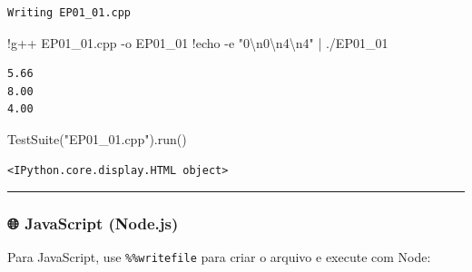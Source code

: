 \documentclass[
  portuguese,
  letterpaper,
  openany,
  oneside,
  12pt,
  a4paper]{book}
\newenvironment{Shaded}{\begin{snugshade}}{\end{snugshade}}
\newcommand{\CharTok}[1]{\textcolor[rgb]{0.13,0.47,0.30}{#1}}
\newcommand{\NormalTok}[1]{\textcolor[rgb]{0.00,0.23,0.31}{#1}}
\newcommand{\OperatorTok}[1]{\textcolor[rgb]{0.37,0.37,0.37}{#1}}
\newcommand{\StringTok}[1]{\textcolor[rgb]{0.13,0.47,0.30}{#1}}
\begin{document}
\begin{verbatim}
Writing EP01_01.cpp
\end{verbatim}

\begin{Shaded}
\begin{Highlighting}[]
\OperatorTok{!}\NormalTok{g}\OperatorTok{++}\NormalTok{ EP01\_01.cpp }\OperatorTok{{-}}\NormalTok{o EP01\_01}
\OperatorTok{!}\NormalTok{echo }\OperatorTok{{-}}\NormalTok{e }\StringTok{"0}\CharTok{\textbackslash{}n}\StringTok{0}\CharTok{\textbackslash{}n}\StringTok{4}\CharTok{\textbackslash{}n}\StringTok{4"} \OperatorTok{|}\NormalTok{ .}\OperatorTok{/}\NormalTok{EP01\_01}
\end{Highlighting}
\end{Shaded}

\begin{verbatim}
5.66
8.00
4.00
\end{verbatim}

\begin{Shaded}
\begin{Highlighting}[]
\NormalTok{TestSuite(}\StringTok{"EP01\_01.cpp"}\NormalTok{).run()}
\end{Highlighting}
\end{Shaded}

\begin{verbatim}
<IPython.core.display.HTML object>
\end{verbatim}

\begin{center}\rule{0.5\linewidth}{0.5pt}\end{center}

\subsubsection{🌐 JavaScript (Node.js)}\label{javascript-node.js}

Para JavaScript, use \texttt{\%\%writefile} para criar o arquivo e
execute com Node:
\end{document}

